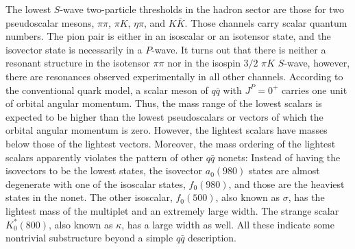 The lowest $S$-wave two-particle thresholds in the hadron sector are those for
 two pseudoscalar mesons, $\pi\pi$, $\pi K$, $\eta\pi$, and $K\bar{K}$.
Those channels carry scalar quantum numbers. The pion pair is either in an
isoscalar or an isotensor state, and the isovector state is necessarily in a
$P$-wave. It turns out that there is neither a resonant structure in the
isotensor $\pi\pi$ nor in the isospin $3/2$ $\pi K$ $S$-wave, however, there are
resonances observed experimentally in all other channels. According to the
conventional quark model, a scalar meson of $q\bar{q}$ with $J^P=0^+$ carries
one unit of orbital angular momentum. Thus, the mass range of the  lowest
scalars is expected to be higher than the lowest pseudoscalars or vectors of
which the orbital angular momentum is zero. However, the lightest scalars have
masses below those of the lightest vectors. Moreover, the mass ordering of the
lightest scalars apparently violates the pattern of other $q\bar{q}$ nonets:
Instead of having the isovectors to be the lowest states, the isovector
$a_0(980)$ states are almost degenerate with one of the isoscalar states,
$f_0(980)$, and those are the heaviest states in the nonet. The other isoscalar,
$f_0(500)$, also known as $\sigma$, has the lightest mass of the multiplet and
an extremely large width. The strange scalar $K_0^*(800)$, also known as
$\kappa$, has a  large width as well. All these indicate some nontrivial
substructure beyond a simple $q\bar{q}$ description.

